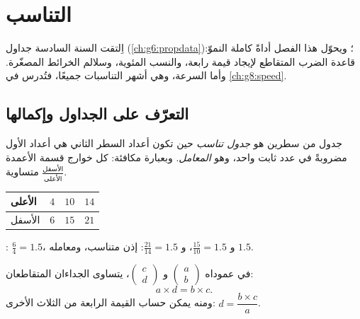 \chapter{التناسب}\label{ch:g7:prop}

اِلتقت السنة السادسة جداول  (\cref{ch:g6:propdata})؛ ويحوّل هذا الفصل
 أداةً كاملة النموّ: قاعدة الضرب المتقاطع لإيجاد
قيمة رابعة، والنسب المئوية، وسلالم الخرائط  المصغّرة.
وأما السرعة، وهي أشهر التناسبات جميعًا، فتُدرس في
\cref{ch:g8:speed}.

\section{التعرّف على الجداول وإكمالها}

\begin{definition}\label{def:g7:prop:table}
جدول من سطرين هو \emph{جدول
تناسب} حين تكون أعداد السطر الثاني
هي أعداد الأول مضروبةً في عدد ثابت واحد، وهو
\emph{المعامل}. وبعبارة مكافئة: كل خوارج قسمة الأعمدة
$\frac{\text{الأسفل}}{\text{الأعلى}}$ متساوية.
\end{definition}

\begin{example}\label{ex:g7:prop:recognize}
\begin{center}
\renewcommand{\arraystretch}{1.3}
\begin{tabular}{l|ccc}
الأعلى & $4$ & $10$ & $14$ \\
\hline
الأسفل & $6$ & $15$ & $21$ \\
\end{tabular}
\end{center}
: $\frac64 = 1.5$، و $\frac{15}{10} = 1.5$،
و $\frac{21}{14} = 1.5$: إذن متناسب، ومعامله $1.5$.
\end{example}

\begin{theorem}\label{thm:g7:prop:cross}
في  عموداه $\begin{pmatrix} a \\ b
\end{pmatrix}$ و $\begin{pmatrix} c \\ d \end{pmatrix}$، يتساوى
الجداءان المتقاطعان:
\[
a \times d = b \times c .
\]
ومنه يمكن حساب القيمة الرابعة من الثلاث الأخرى:
$d = \dfrac{b \times c}{a}$.
\end{theorem}

